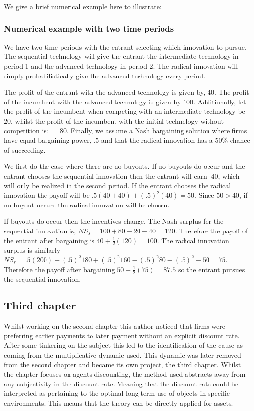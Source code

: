 We give a brief numerical example here to illustrate: 
\subsubsection{Numerical example with two time periods}


We have two time periods with the entrant selecting which innovation to pursue. The sequential technology will give the entrant the intermediate technology in period 1 and the advanced technology in period 2. The radical innovation will simply probabilistically give the advanced technology every period. 

The profit of the entrant with the advanced technology is given by, $40$. The profit of the incumbent with the advanced technology is given by $100$. Additionally, let the profit of the incumbent when competing with an intermediate technology be $20$, whilst the profit of the incumbent with the initial technology without competition is: $=80$. Finally, we assume a Nash bargaining solution where firms have equal bargaining power, $.5$ and that the radical innovation has a $50$\% chance of succeeding. 

We first do the case where there are no buyouts. If no buyouts do occur and the entrant chooses the sequential innovation then the entrant will earn, $40$, which will only be realized in the second period. If the entrant chooses the radical innovation the payoff will be $.5(40+40)+(.5)^2(40)=50$. Since $50>40$, if no buyout occurs the radical innovation will be chosen. 

If buyouts do occur then the incentives change. The Nash surplus for the sequential innovation is, $NS_s = 100+80-20-40=120$. Therefore the payoff of the entrant after bargaining is $40+\frac{1}{2}(120)=100$. The radical innovation surplus is similarly $NS_r = .5(200)+(.5)^2 180+(.5)^2 160-(.5)^2 80-(.5)^2-50=75$. Therefore the payoff after bargaining $50+\frac{1}{2}(75)=87.5$ so the entrant pursues the sequential innovation. 

 \subsection{Third chapter}

Whilst working on the second chapter this author noticed that firms were preferring earlier payments to later payment without an explicit discount rate. After some tinkering on the subject this led to the identification of the cause as coming from the multiplicative dynamic used. This dynamic was later removed from the second chapter and became its own project, the third chapter. Whilst the chapter focuses on agents discounting, the method used abstracts away from any subjectivity in the discount rate. Meaning that the discount rate could be interpreted as pertaining to the optimal long term use of objects in specific environments. This means that the theory can be directly applied for assets.  

